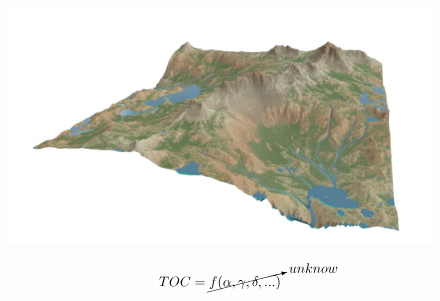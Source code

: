\documentclass[aspectratio=169]{beamer} %
\begin{document}
{
{
\begin{frame}
	\vspace{0.1cm}
	\begin{figure}
		\centering
		\includegraphics[scale=0.4]{images/HL.png}
	\end{figure}
\begin{equation}
	TOC = \cancelto{unknow}{f(\alpha,\gamma,\delta,...)}  \nonumber
\end{equation}
\end{frame}
}
}
\end{document}

